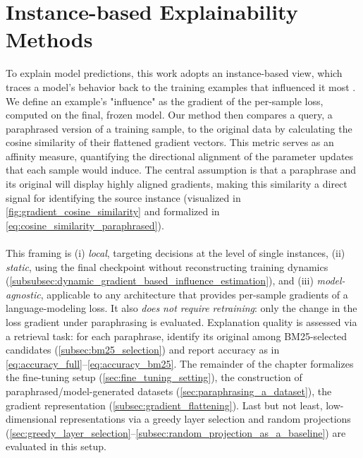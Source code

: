 \section{Instance-based Explainability Methods}
To explain model predictions, this work adopts an instance-based view, which traces a model's behavior back to the training examples that influenced it most \cite{DBLP:conf/icml/KohL17}. We define an example's "influence" as the gradient of the per-sample loss, computed on the final, frozen model. Our method then compares a query, a paraphrased version of a training sample, to the original data by calculating the cosine similarity of their flattened gradient vectors. This metric serves as an affinity measure, quantifying the directional alignment of the parameter updates that each sample would induce. The central assumption is that a paraphrase and its original will display highly aligned gradients, making this similarity a direct signal for identifying the source instance (visualized in \autoref{fig:gradient_cosine_similarity} and formalized in \autoref{eq:cosine_similarity_paraphrased}).
\\\\
This framing is (i) \emph{local}, targeting decisions at the level of single instances, (ii) \emph{static}, using the final checkpoint without reconstructing training dynamics (\autoref{subsubsec:dynamic_gradient_based_influence_estimation}), and (iii) \emph{model-agnostic}, applicable to any architecture that provides per-sample gradients of a language-modeling loss. It also \emph{does not require retraining}: only the change in the loss gradient under paraphrasing is evaluated. Explanation quality is assessed via a retrieval task: for each paraphrase, identify its original among BM25-selected candidates (\autoref{subsec:bm25_selection}) and report accuracy as in \autoref{eq:accuracy_full}–\autoref{eq:accuracy_bm25}. The remainder of the chapter formalizes the fine-tuning setup (\autoref{sec:fine_tuning_setting}), the construction of paraphrased/model-generated datasets (\autoref{sec:paraphrasing_a_dataset}), the gradient representation (\autoref{subsec:gradient_flattening}). Last but not least, low-dimensional representations via a greedy layer selection and random projections (\autoref{sec:greedy_layer_selection}–\autoref{subsec:random_projection_as_a_baseline}) are evaluated in this setup.

